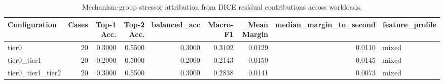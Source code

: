 \begin{table}[t]
\centering
\caption{Mechanism-group stressor attribution from DICE residual contributions across workloads.}
\label{tab:dice_stressor_diagnosis}
\footnotesize
\begin{tabular}{lrrrrrrrl}
\toprule
Configuration & Cases & Top-1 Acc. & Top-2 Acc. & balanced_acc & Macro-F1 & Mean Margin & median_margin_to_second & feature_profile \\
\midrule
tier0 & 20 & 0.3000 & 0.5500 & 0.3000 & 0.3102 & 0.0129 & 0.0110 & mixed \\
tier0_tier1 & 20 & 0.2000 & 0.5000 & 0.2000 & 0.2143 & 0.0159 & 0.0145 & mixed \\
tier0_tier1_tier2 & 20 & 0.3000 & 0.5500 & 0.3000 & 0.2838 & 0.0141 & 0.0073 & mixed \\
\bottomrule
\end{tabular}

\end{table}
